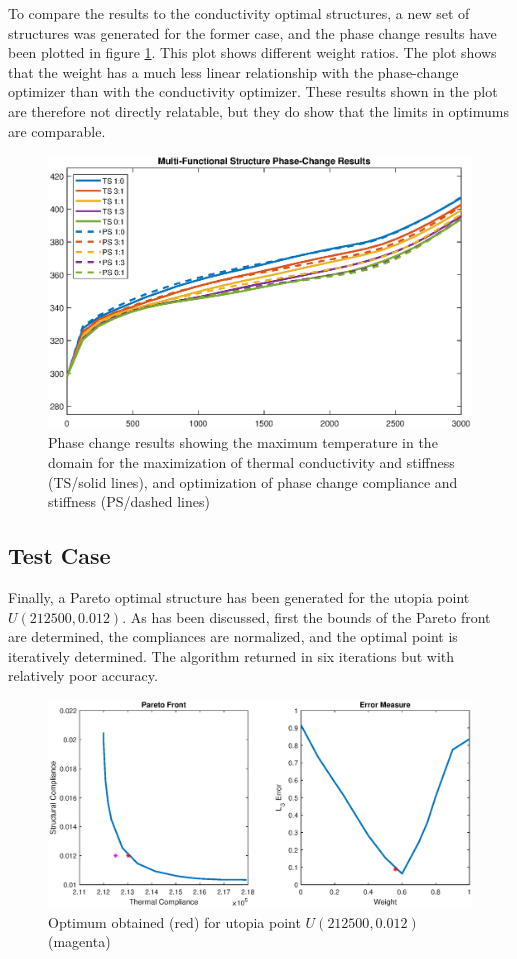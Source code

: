 To compare the results to the conductivity optimal structures, a new set of structures was generated for the former case, and the phase change results have been plotted in figure \ref{fig:phase_change_results_coarsest}. This plot shows different weight ratios. The plot shows that the weight has a much less linear relationship with the phase-change optimizer than with the conductivity optimizer. These results shown in the plot are therefore not directly relatable, but they do show that the limits in optimums are comparable.
\begin{figure}[ht]
    \centering
    \includegraphics[width=0.7\linewidth]{figures/chapter_5/PhaseChangeResultsCoarsest.eps}
    \caption{Phase change results showing the maximum temperature in the domain for the maximization of thermal conductivity and stiffness (TS/solid lines), and optimization of phase change compliance and stiffness (PS/dashed lines)}
    \label{fig:phase_change_results_coarsest}
\end{figure}

\subsection*{Test Case}
Finally, a Pareto optimal structure has been generated for the utopia point $U(212500, 0.012)$. As has been discussed, first the bounds of the Pareto front are determined, the compliances are normalized, and the optimal point is iteratively determined. The algorithm returned in six iterations but with relatively poor accuracy.
\begin{figure}[ht]
    \centering
    \includegraphics[width=0.8\linewidth]{figures/chapter_5/ParetoOpt_PC.eps}
    \caption{Optimum obtained (red) for utopia point $U(212500,0.012)$ (magenta)}
    \label{fig:pareto_optimum_phase_change}
\end{figure}

